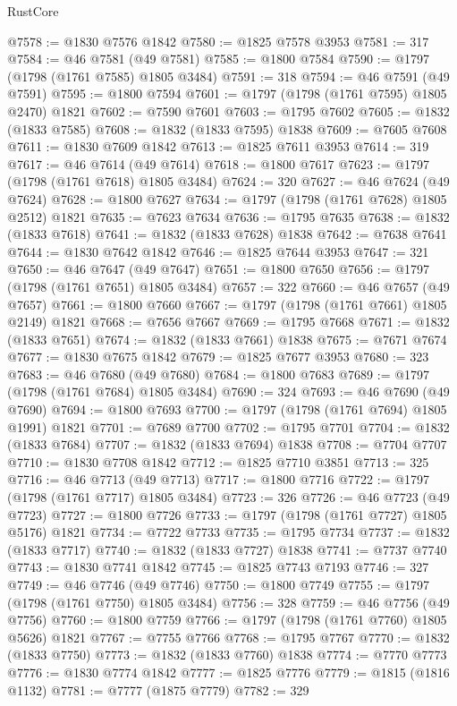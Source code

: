 \begin{lexlean}{RustCore}
\begin{coremodule}
@7578 := @1830 @7576 @1842
@7580 := @1825 @7578 @3953
@7581 := 317
@7584 := @46 @7581 (@49 @7581)
@7585 := @1800 @7584
@7590 := @1797 (@1798 (@1761 @7585) @1805 @3484)
@7591 := 318
@7594 := @46 @7591 (@49 @7591)
@7595 := @1800 @7594
@7601 := @1797 (@1798 (@1761 @7595) @1805 @2470) @1821
@7602 := @7590 @7601
@7603 := @1795 @7602
@7605 := @1832 (@1833 @7585)
@7608 := @1832 (@1833 @7595) @1838
@7609 := @7605 @7608
@7611 := @1830 @7609 @1842
@7613 := @1825 @7611 @3953
@7614 := 319
@7617 := @46 @7614 (@49 @7614)
@7618 := @1800 @7617
@7623 := @1797 (@1798 (@1761 @7618) @1805 @3484)
@7624 := 320
@7627 := @46 @7624 (@49 @7624)
@7628 := @1800 @7627
@7634 := @1797 (@1798 (@1761 @7628) @1805 @2512) @1821
@7635 := @7623 @7634
@7636 := @1795 @7635
@7638 := @1832 (@1833 @7618)
@7641 := @1832 (@1833 @7628) @1838
@7642 := @7638 @7641
@7644 := @1830 @7642 @1842
@7646 := @1825 @7644 @3953
@7647 := 321
@7650 := @46 @7647 (@49 @7647)
@7651 := @1800 @7650
@7656 := @1797 (@1798 (@1761 @7651) @1805 @3484)
@7657 := 322
@7660 := @46 @7657 (@49 @7657)
@7661 := @1800 @7660
@7667 := @1797 (@1798 (@1761 @7661) @1805 @2149) @1821
@7668 := @7656 @7667
@7669 := @1795 @7668
@7671 := @1832 (@1833 @7651)
@7674 := @1832 (@1833 @7661) @1838
@7675 := @7671 @7674
@7677 := @1830 @7675 @1842
@7679 := @1825 @7677 @3953
@7680 := 323
@7683 := @46 @7680 (@49 @7680)
@7684 := @1800 @7683
@7689 := @1797 (@1798 (@1761 @7684) @1805 @3484)
@7690 := 324
@7693 := @46 @7690 (@49 @7690)
@7694 := @1800 @7693
@7700 := @1797 (@1798 (@1761 @7694) @1805 @1991) @1821
@7701 := @7689 @7700
@7702 := @1795 @7701
@7704 := @1832 (@1833 @7684)
@7707 := @1832 (@1833 @7694) @1838
@7708 := @7704 @7707
@7710 := @1830 @7708 @1842
@7712 := @1825 @7710 @3851
@7713 := 325
@7716 := @46 @7713 (@49 @7713)
@7717 := @1800 @7716
@7722 := @1797 (@1798 (@1761 @7717) @1805 @3484)
@7723 := 326
@7726 := @46 @7723 (@49 @7723)
@7727 := @1800 @7726
@7733 := @1797 (@1798 (@1761 @7727) @1805 @5176) @1821
@7734 := @7722 @7733
@7735 := @1795 @7734
@7737 := @1832 (@1833 @7717)
@7740 := @1832 (@1833 @7727) @1838
@7741 := @7737 @7740
@7743 := @1830 @7741 @1842
@7745 := @1825 @7743 @7193
@7746 := 327
@7749 := @46 @7746 (@49 @7746)
@7750 := @1800 @7749
@7755 := @1797 (@1798 (@1761 @7750) @1805 @3484)
@7756 := 328
@7759 := @46 @7756 (@49 @7756)
@7760 := @1800 @7759
@7766 := @1797 (@1798 (@1761 @7760) @1805 @5626) @1821
@7767 := @7755 @7766
@7768 := @1795 @7767
@7770 := @1832 (@1833 @7750)
@7773 := @1832 (@1833 @7760) @1838
@7774 := @7770 @7773
@7776 := @1830 @7774 @1842
@7777 := @1825 @7776
@7779 := @1815 (@1816 @1132)
@7781 := @7777 (@1875 @7779)
@7782 := 329

\end{coremodule}
\end{lexlean}

